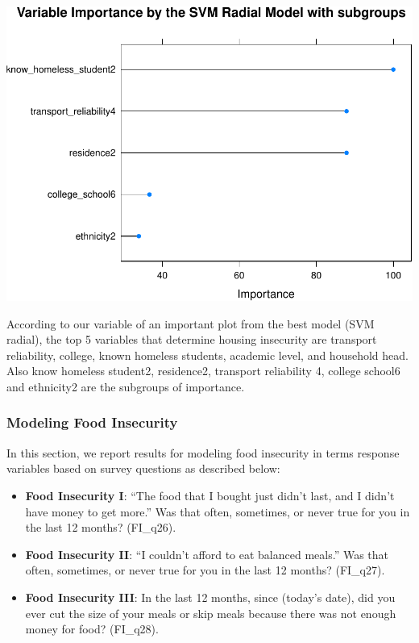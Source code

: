 \documentclass[
  10pt,
]{article}
\begin{document}
\begin{center}\includegraphics{phase2_report_files/figure-latex/unnamed-chunk-16-1} \end{center}

\hfill\break
According to our variable of an important plot from the best model (SVM radial), the top 5 variables that determine housing insecurity are transport reliability, college, known homeless students, academic level, and household head. Also know homeless student2, residence2, transport reliability 4, college school6 and ethnicity2 are the subgroups of importance.\\

\hypertarget{modeling-food-insecurity}{%
\subsubsection{Modeling Food Insecurity}\label{modeling-food-insecurity}}

In this section, we report results for modeling food insecurity in terms response variables based on survey questions as described below:

\begin{itemize}
\item
  \textbf{Food Insecurity I}: ``The food that I bought just didn't last, and I didn't have money to get more.'' Was that often, sometimes, or never true for you in the last 12 months? (FI\_q26).
\item
  \textbf{Food Insecurity II}: ``I couldn't afford to eat balanced meals.'' Was that often, sometimes, or never true for you in the last 12 months? (FI\_q27).
\item
  \textbf{Food Insecurity III}: In the last 12 months, since (today's date), did you ever cut the size of your meals or skip meals because there was not enough money for food? (FI\_q28).
\end{itemize}
\end{document}
